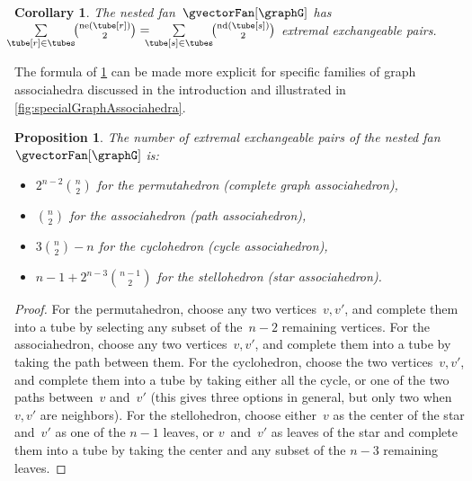 \documentclass{amsart}
\newtheorem{corollary}[theorem]{Corollary}
\newtheorem{proposition}[theorem]{Proposition}
\theoremstyle{definition}
\newcommand{\nonDisconnecting}{\mathrm{nd}} %
\newcommand{\neighbors}{\mathrm{ne}} %
\begin{document}
\begin{corollary}
\label{coro:numberExtremalExchangeablePairsGA}
The nested fan~$\gvectorFan[\graphG]$ has~$\!\!\!\! \sum\limits_{\tube[r] \in \tubes} \!\! \binom{\neighbors(\tube[r])}{2} = \!\!\!\! \sum\limits_{\tube[s] \in \tubes} \!\! \binom{\nonDisconnecting(\tube[s])}{2}$ extremal exchangeable pairs.
\end{corollary}


The formula of \cref{coro:numberExtremalExchangeablePairsGA} can be made more explicit for specific families of graph associahedra discussed in the introduction and illustrated in \cref{fig:specialGraphAssociahedra}.

\begin{proposition}
The number of extremal exchangeable pairs of the nested fan~$\gvectorFan[\graphG]$ is:
\begin{itemize}
\item $2^{n-2}\binom{n}{2}$ for the permutahedron (complete graph associahedron),
\item $\binom{n}{2}$ for the associahedron (path associahedron),
\item $3\binom{n}{2} - n$ for the cyclohedron (cycle associahedron),
\item $n-1+2^{n-3}\binom{n-1}{2}$ for the stellohedron (star associahedron).
\end{itemize}
\end{proposition}

\begin{proof}
For the permutahedron, choose any two vertices~$v,v'$, and complete them into a tube by selecting any subset of the~$n-2$ remaining vertices.
For the associahedron, choose any two vertices~$v,v'$, and complete them into a tube by taking the path between them.
For the cyclohedron, choose the two vertices~$v,v'$, and complete them into a tube by taking either all the cycle, or one of the two paths between~$v$ and~$v'$ (this gives three options in general, but only two when~$v,v'$ are neighbors).
For the stellohedron, choose either~$v$ as the center of the star and~$v'$ as one of the $n-1$ leaves, or $v$~and~$v'$ as leaves of the star and complete them into a tube by taking the center and any subset of the $n-3$ remaining leaves.
\end{proof}
\end{document}
